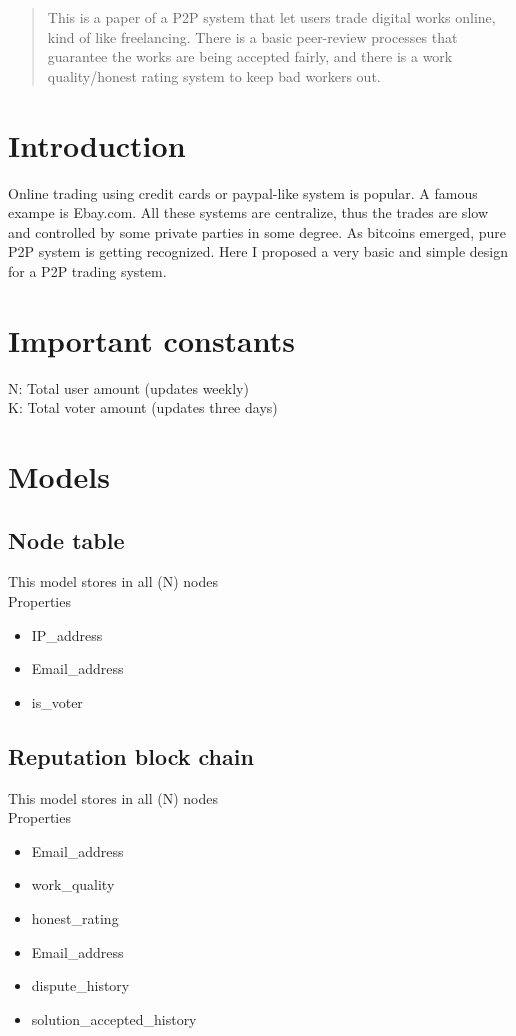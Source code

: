 \documentclass[12pt]{article}
\begin{document}
\maketitle

\begin{abstract}
This is a paper of a P2P system that let users trade digital works online, kind of like freelancing. There is a basic peer-review processes that guarantee the works are being accepted fairly, and there is a work quality/honest rating system to keep bad workers out. 
\end{abstract}

\section{Introduction}
Online trading using credit cards or paypal-like system is popular. A famous exampe is Ebay.com. All these systems are centralize, thus the trades are slow and controlled by some private parties in some degree. As bitcoins emerged, pure P2P system is getting recognized. Here I proposed a very basic and simple design for a P2P trading system. 

\section{Important constants}
N: Total user amount (updates weekly)\\
K: Total voter amount (updates three days)\\

\section{Models}

\subsection{Node table}
This model stores in all (N) nodes\\
Properties
\begin{itemize}
	\item IP\_address
	\item Email\_address
	\item is\_voter
\end{itemize}

\subsection{Reputation block chain}
This model stores in all (N) nodes\\
Properties
\begin{itemize}
	\item Email\_address
	\item work\_quality
	\item honest\_rating
\end{itemize}
\begin{itemize}
	\item Email\_address
	\item dispute\_history
	\item solution\_accepted\_history
\end{itemize}
\end{document}
